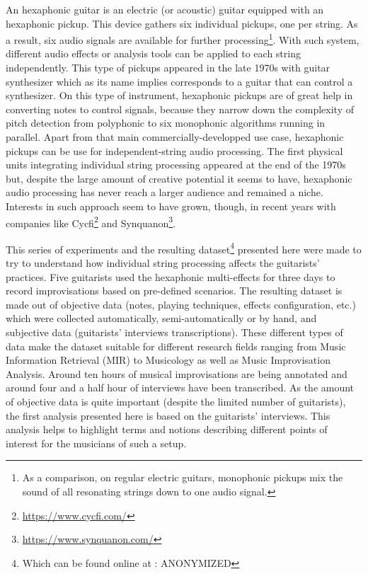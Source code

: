 \documentclass{article}
\begin{document}
An hexaphonic guitar is an electric (or acoustic) guitar equipped with an hexaphonic pickup. This device gathers six individual pickups, one per string. As a result, six audio signals are available for further processing\footnote{As a comparison, on regular electric guitars, monophonic pickups mix the sound of all resonating strings down to one audio signal. }. With such system, different audio effects or analysis tools can be applied to each string independently. This type of pickups appeared in the late 1970s with guitar synthesizer which as its name implies corresponds to a guitar that can control a synthesizer. On this type of instrument, hexaphonic pickups are of great help in converting notes to control signals, because they narrow down the complexity of pitch detection from polyphonic to six monophonic algorithms running in parallel. Apart from that main commercially-developped use case, hexaphonic pickups can be use for independent-string audio processing. The first physical units integrating individual string processing appeared at the end of the 1970s 
but, despite the large amount of creative potential it seems to have, hexaphonic audio processing has never reach a larger audience and remained a niche.  Interests in such approach seem to have grown, though, in recent years with companies like Cycfi\footnote{\url{https://www.cycfi.com/}} and Synquanon\footnote{\url{https://www.synquanon.com/}}.

This series of experiments and the resulting dataset\footnote{Which can be found online at : ANONYMIZED} presented here were made to try to understand how individual string processing affects the guitarists' practices.  Five guitarists used the hexaphonic multi-effects for three days to record improvisations based on pre-defined scenarios.
The resulting dataset is made out of objective data (notes, playing techniques, effects configuration, etc.) which were collected automatically, semi-automatically or by hand, and subjective data (guitarists' interviews transcriptions).  These different types of data make the dataset suitable for different research fields ranging from Music Information Retrieval (MIR) to Musicology as well as Music Improvisation Analysis. Around ten hours of musical improvisations are being annotated and around four and a half hour of interviews have been transcribed. As the amount of objective data is quite important (despite the limited number of guitarists), the first analysis presented here is based on the guitarists' interviews. This analysis helps to highlight terms and notions describing different points of interest for the musicians of such a setup. 
\end{document}
